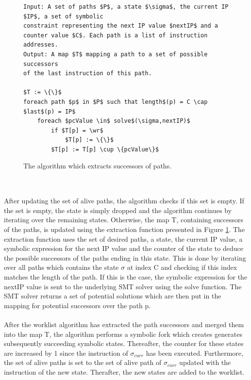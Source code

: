 \documentclass{kththesis}
\begin{document}
\begin{figure}[!t]
    \centering
\begin{algorithmFrame}
\begin{lstlisting}[style=algorithm]
Input: A set of paths $P$, a state $\sigma$, the current IP $IP$, a set of symbolic
constraint representing the next IP value $nextIP$ and a 
counter value $C$. Each path is a list of instruction addresses. 
Output: A map $T$ mapping a path to a set of possible successors 
of the last instruction of this path.

$T := \{\}$
foreach path $p$ in $P$ such that length$(p) = C \cap $last$(p) = IP$
    foreach $pcValue \in$ solve$(\sigma,nextIP)$
        if $T[p] = \wr$
            $T[p] := \{\}$    
        $T[p] := T[p] \cup \{pcValue\}$

\end{lstlisting}
\end{algorithmFrame}
\caption[The algorithm which extracts successors of paths.]{The algorithm which extracts successors of paths.}
    \label{fig:DSEextract}
\end{figure}
\\ \\
After updating the set of alive paths, the algorithm checks if this set is empty. If the set is empty, the state is simply dropped and the algorithm continues by iterating over the remaining states. Otherwise, the map T, containing successors of the paths, is updated using the extraction function presented in Figure \ref{fig:DSEextract}. The extraction function uses the set of desired paths, a state, the current IP value, a symbolic expression for the next IP value and the counter of the state to deduce the possible successors of the paths ending in this state. This is done by iterating over all paths which contains the state $\sigma$ at index C and checking if this index matches the length of the path. If this is the case, the symbolic expression for the nextIP value is sent to the underlying SMT solver using the solve function. The SMT solver returns a set of potential solutions which are then put in the mapping for potential successors over the path p.
\\ \\
After the worklist algorithm has extracted the path successors and merged them into the map T, the algorithm performs a symbolic fork which creates generates subsequently succeeding symbolic states. Thereafter, the counter for these states are increased by 1 since the instruction of $\sigma_{curr}$ has been executed. Furthermore, the set of alive paths is set to the set of alive path of $\sigma_{curr}$ updated with the instruction of the new state. Therafter, the new states are added to the worklist.
\end{document}
